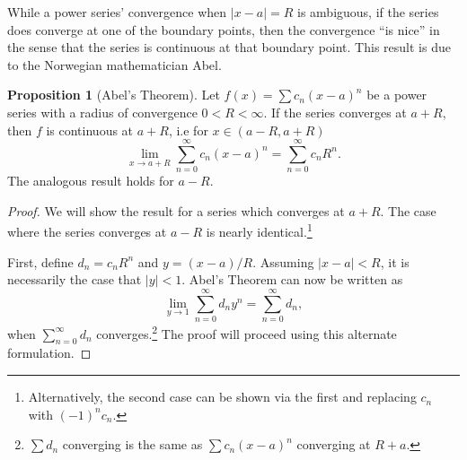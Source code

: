 \documentclass{article}
\theoremstyle{definition}
\newtheorem{proposition}{Proposition}[section]
\begin{document}
	While a power series' convergence when $ |x-a|=R $ is ambiguous, if the series does converge at one of the boundary points, then the convergence ``is nice'' in the sense that the series is continuous at that boundary point. This result is due to the Norwegian mathematician Abel. 
	\begin{proposition}[Abel's Theorem]
		Let $ f(x)=\sum c_n(x-a)^n $ be a power series with a radius of convergence $ 0<R<\infty $.  If the series converges at $ a+R $, then $ f $ is continuous at $ a+R $, i.e for $ x\in(a-R,a+R) $ 
		$$ \lim\limits_{x\to a + R}\sum_{n=0}^{\infty}c_n(x-a)^n = \sum_{n=0}^\infty c_nR^n  .$$
		The analogous result holds for $ a-R $.
	\end{proposition}
	\begin{proof}
		We will show the result for a series which converges at $ a+R $. The case where the series converges at $ a-R $ is nearly identical.\footnote{Alternatively, the second case can be shown via the first and replacing $ c_n $ with $ (-1)^nc_n$.}
		
		First, define $ d_n = c_nR^n $ and $ y=(x-a)/R $. Assuming $ |x-a|<R $, it is necessarily the case that $ |y|<1 $. Abel's Theorem can now be written as $$ \lim\limits_{y\to 1}\sum_{n=0}^{\infty}d_ny^n= \sum_{n=0}^{\infty}d_n,$$ when $  \sum_{n=0}^{\infty}d_n $ converges.\footnote{$  \sum d_n $ converging is the same as $ \sum c_n(x-a)^n $ converging at $ R+a $.} The proof will proceed using this alternate formulation.  
		

\end{proof}
\end{document}
